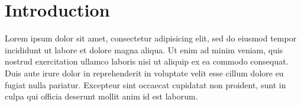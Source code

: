 \chapter{Introduction}\label{ch:introduction}
Lorem ipsum dolor sit amet, consectetur adipisicing elit, sed do eiusmod
tempor incididunt ut labore et dolore magna aliqua. Ut enim ad minim veniam,
quis nostrud exercitation ullamco laboris nisi ut aliquip ex ea commodo
consequat. Duis aute irure dolor in reprehenderit in voluptate velit esse
cillum dolore eu fugiat nulla pariatur. Excepteur sint occaecat cupidatat non
proident, sunt in culpa qui officia deserunt mollit anim id est laborum.\cite{bentley:1999}





